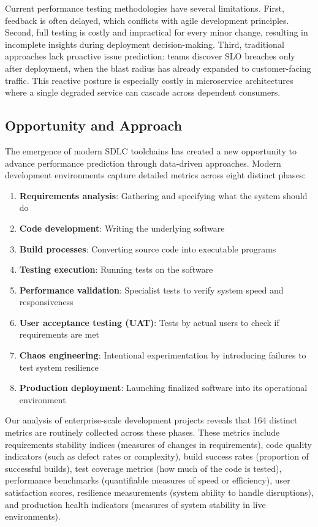 \documentclass[technologies,article,submit,pdftex,moreauthors]{Definitions/mdpi}
\begin{document}
Current performance testing methodologies have several limitations.
First, feedback is often delayed, which conflicts with agile development
principles. Second, full testing is costly and impractical for every
minor change, resulting in incomplete insights during deployment
decision-making. Third, traditional approaches lack proactive issue
prediction: teams discover SLO breaches only after deployment, when the
blast radius has already expanded to customer-facing traffic. This
reactive posture is especially costly in microservice architectures
where a single degraded service can cascade across dependent consumers.

\subsection{Opportunity and Approach}\label{sec:opportunity}

The emergence of modern SDLC toolchains has created a new opportunity to
advance performance prediction through data-driven approaches. Modern
development environments capture detailed metrics across eight distinct
phases:

\begin{enumerate}
\def\labelenumi{\arabic{enumi}.}
\item
  \textbf{Requirements analysis}: Gathering and specifying what the
  system should do
\item
  \textbf{Code development}: Writing the underlying software
\item
  \textbf{Build processes}: Converting source code into executable
  programs
\item
  \textbf{Testing execution}: Running tests on the software
\item
  \textbf{Performance validation}: Specialist tests to verify system
  speed and responsiveness
\item
  \textbf{User acceptance testing (UAT)}: Tests by actual users to check
  if requirements are met
\item
  \textbf{Chaos engineering}: Intentional experimentation by introducing
  failures to test system resilience
\item
  \textbf{Production deployment}: Launching finalized software into its
  operational environment
\end{enumerate}

Our analysis of enterprise-scale development projects reveals that 164
distinct metrics are routinely collected across these phases. These
metrics include requirements stability indices (measures of changes in
requirements), code quality indicators (such as defect rates or
complexity), build success rates (proportion of successful builds), test
coverage metrics (how much of the code is tested), performance
benchmarks (quantifiable measures of speed or efficiency), user
satisfaction scores, resilience measurements (system ability to handle
disruptions), and production health indicators (measures of system
stability in live environments).
\end{document}
